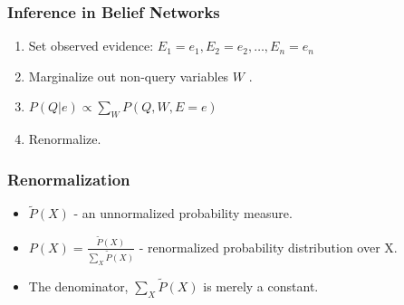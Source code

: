 \documentclass[12pt]{beamer} %
\begin{document}
                                                        \begin{frame}
                                                        \frametitle{Inference in Belief Networks}
                                                        \begin{enumerate}
                                                        \item Set observed evidence: $E_1=e_1, E_2=e_2, \dots, E_n=e_n$
                                                        \item Marginalize out non-query variables $W$ .
                                                        \item $P(Q|e) \propto \sum_W P(Q, W, E=e)$
                                                        \item Renormalize.
                                                        \end{enumerate}

                                                        \end{frame}


                                                        \begin{frame}
                                                        \frametitle{Renormalization}
                                                        \begin{itemize}
                                                        \item $\tilde{P}(X)$ - an unnormalized probability measure.
                                                        \item $P(X) = \frac{\tilde{P}(X)}{\sum_X \tilde{P}(X)}$ - renormalized probability distribution over X.
                                                        \item The denominator, $\sum_X \tilde{P}(X)$ is merely a constant.
                                                        \end{itemize}

                                                        \end{frame}
\end{document}
